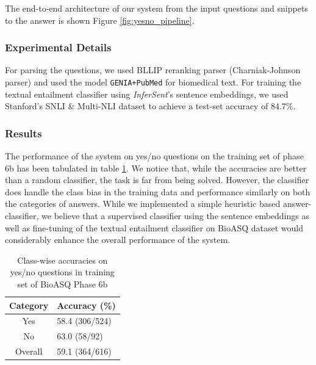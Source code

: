 \documentclass[11pt,a4paper]{article}
\begin{document}
    The end-to-end architecture of our system from the input questions and snippets to the answer is shown Figure \ref{fig:yesno_pipeline}.
    
\subsubsection{Experimental Details}

For parsing the questions, we used BLLIP reranking parser \cite{charniak_new1} (Charniak-Johnson parser) %
and used the model \texttt{GENIA+PubMed} for biomedical text. For training the textual entailment classifier using \textit{InferSent}'s sentence embeddings, we used Stanford's SNLI \& Multi-NLI dataset \cite{snli} to achieve a test-set accuracy of $84.7 \%$.

\subsubsection{Results}

The performance of the system on yes/no questions on the training set of phase 6b has been tabulated in table \ref{tab:yesno_results}. We notice that, while the accuracies are better than a random classifier, the task is far from being solved. However, the classifier does handle the class bias in the training data and performance similarly on both the categories of answers. While we implemented a simple heuristic based answer-classifier, we believe that a supervised classifier using the sentence embeddings as well as fine-tuning of the textual entailment classifier on BioASQ dataset would considerably enhance the overall performance of the system.

\begin{table}[t!]
    \centering
    \begin{tabular}{c|l} \hline
    
    Category & Accuracy (\%) \\ \hline
    Yes      &  58.4  (306/524)\\
    No       &  63.0 (58/92) \\
    Overall  &  59.1 (364/616) \\      \hline
    \end{tabular}
    \caption{Class-wise accuracies on yes/no questions in training set of BioASQ Phase 6b}
    \label{tab:yesno_results}
\end{table}
\end{document}
